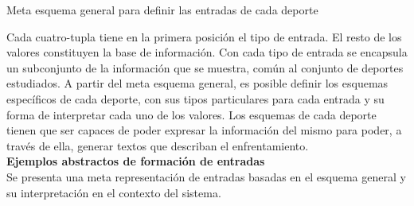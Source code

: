 \begin{table}[]
\begin{center}
    \end{center}
    \caption{Meta esquema general para definir las entradas de cada deporte}
    \label{tab:esquema_general}
\end{table}

    Cada cuatro-tupla tiene en la primera posición el tipo de entrada. El resto de los valores constituyen la base de información. Con cada tipo de entrada 
se encapsula un subconjunto de la información que se muestra, común al conjunto de deportes estudiados. 
    A partir del meta esquema general, es posible definir los esquemas específicos de cada deporte, con sus tipos particulares para cada entrada y su forma de interpretar 
cada uno de los valores. Los esquemas de cada deporte tienen que ser capaces de poder expresar la información del mismo para poder, a través de ella, 
generar textos que describan el enfrentamiento. \\


    \textbf{Ejemplos abstractos de formación de entradas}\\

    Se presenta una meta representación de entradas basadas en el esquema general y su interpretación en el contexto del sistema.

